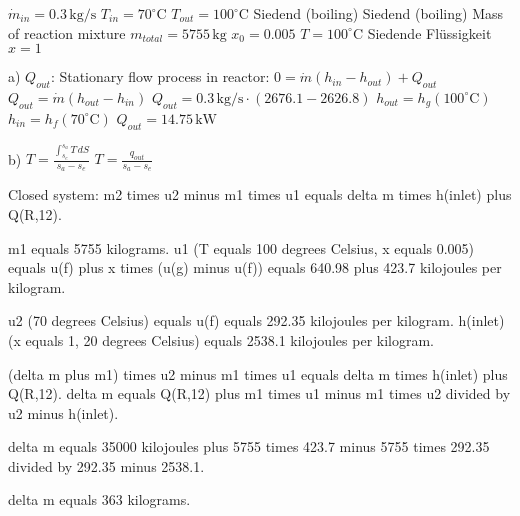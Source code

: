 \( \dot{m}_{in} = 0.3 \, \text{kg/s} \)  
\( T_{in} = 70^\circ \text{C} \)  
\( T_{out} = 100^\circ \text{C} \)  
Siedend (boiling)  
Siedend (boiling)  
Mass of reaction mixture \( m_{total} = 5755 \, \text{kg} \)  
\( x_0 = 0.005 \)  
\( T = 100^\circ \text{C} \)  
Siedende Flüssigkeit \( x = 1 \)  

a) \( Q_{out} \): Stationary flow process in reactor:  
\( 0 = \dot{m} (h_{in} - h_{out}) + Q_{out} \)  
\( Q_{out} = \dot{m} (h_{out} - h_{in}) \)  
\( Q_{out} = 0.3 \, \text{kg/s} \cdot (2676.1 - 2626.8) \)  
\( h_{out} = h_g (100^\circ \text{C}) \)  
\( h_{in} = h_f (70^\circ \text{C}) \)  
\( Q_{out} = 14.75 \, \text{kW} \)  

b) \( T = \frac{\int_{s_e}^{s_a} T \, dS}{s_a - s_e} \)  
\( T = \frac{q_{out}}{s_a - s_e} \)

Closed system:  
m2 times u2 minus m1 times u1 equals delta m times h(inlet) plus Q(R,12).  

m1 equals 5755 kilograms.  
u1 (T equals 100 degrees Celsius, x equals 0.005) equals u(f) plus x times (u(g) minus u(f)) equals 640.98 plus 423.7 kilojoules per kilogram.  

u2 (70 degrees Celsius) equals u(f) equals 292.35 kilojoules per kilogram.  
h(inlet) (x equals 1, 20 degrees Celsius) equals 2538.1 kilojoules per kilogram.  

(delta m plus m1) times u2 minus m1 times u1 equals delta m times h(inlet) plus Q(R,12).  
delta m equals Q(R,12) plus m1 times u1 minus m1 times u2 divided by u2 minus h(inlet).  

delta m equals 35000 kilojoules plus 5755 times 423.7 minus 5755 times 292.35 divided by 292.35 minus 2538.1.  

delta m equals 363 kilograms.